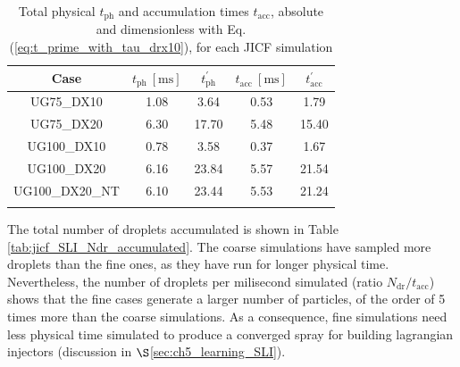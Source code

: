 \begin{table}[!h]
\centering
\caption{Total physical $t_\mathrm{ph}$ and accumulation times $t_\mathrm{acc}$, absolute and dimensionless with Eq. (\ref{eq:t_prime_with_tau_drx10}), for each JICF simulation}
\begin{tabular}{ccccc}
\thickhline
\textbf{Case} & $t_\mathrm{ph}~[\mathrm{ms}]$ &  $t_\mathrm{ph}^{\prime}$ & $t_\mathrm{acc}~[\mathrm{ms}]$  & $t_\mathrm{acc}^{\prime}$  \\
\hline
UG75\_DX10 & 1.08 & 3.64 & 0.53 & 1.79 \\
UG75\_DX20 & 6.30 & 17.70 & 5.48  & 15.40 \\
UG100\_DX10 & 0.78  & 3.58 & 0.37 & 1.67 \\
UG100\_DX20  & 6.16 & 23.84 & 5.57 & 21.54 \\
UG100\_DX20\_NT  & 6.10  & 23.44 & 5.53 &  21.24 \\
\thickhline
\end{tabular}
\label{tab:jicf_SLI_t_prime_accumulation}
\end{table}


The total number of droplets accumulated is shown in Table \ref{tab:jicf_SLI_Ndr_accumulated}. The coarse simulations have sampled more droplets than the fine ones, as they have run for longer physical time. Nevertheless, the number of droplets per milisecond simulated (ratio $N_\mathrm{dr}/t_\mathrm{acc}$) shows that the fine cases generate a larger number of particles, of the order of 5 times more than the coarse simulations. As a consequence, fine simulations need less physical time simulated to produce a converged spray for building lagrangian injectors (discussion in $\S$\ref{sec:ch5_learning_SLI}).


